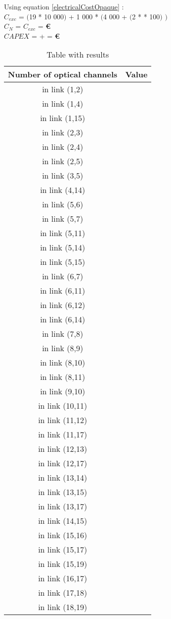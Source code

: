 Using equation \ref{electricalCostOpaque} : \\
$C_{exc}$ = $($19 * 10 000$)$ + 1 000 * $($4 000 + $($2 *  * 100$)$ $)$ \\
$C_N$ = $C_{exc}$ = \textbf{ \euro} \\

$CAPEX$ =  +  = \textbf{ \euro}\\

\begin{table}[h!]
\centering
\begin{tabular}{|| c | c||}
 \hline
 Number of optical channels & Value \\
 \hline\hline
in link (1,2) &  \\
in link (1,4) &  \\
in link (1,15) &  \\
in link (2,3) &  \\
in link (2,4) &  \\
in link (2,5) &  \\
in link (3,5) &  \\
in link (4,14) &  \\
in link (5,6) &  \\
in link (5,7) &  \\
in link (5,11) &  \\
in link (5,14) &  \\
in link (5,15) &  \\
in link (6,7) &  \\
in link (6,11) &  \\
in link (6,12) &  \\
in link (6,14) &  \\
in link (7,8) &  \\
in link (8,9) &  \\
in link (8,10) &  \\
in link (8,11) &  \\
in link (9,10) &  \\
in link (10,11) &  \\
in link (11,12) &  \\
in link (11,17) &  \\
in link (12,13) &  \\
in link (12,17) &  \\
in link (13,14) &  \\
in link (13,15) &  \\
in link (13,17) &  \\
in link (14,15) &  \\
in link (15,16) &  \\
in link (15,17) &  \\
in link (15,19) &  \\
in link (16,17) &  \\
in link (17,18) &  \\
in link (18,19) &  \\
\hline
\end{tabular}
\caption{Table with results}
\label{result_ILP3_without}
\end{table}

